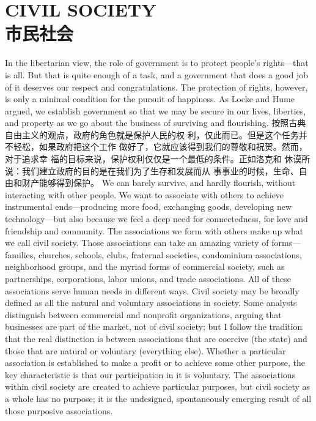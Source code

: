 \chapter{CIVIL SOCIETY\\市民社会}
\begin{paracol}{2}

In the libertarian view, the role of government is to protect people's rights---that is all. But that is quite
enough of a task, and a government that does a good job of it
deserves our respect and congratulations. The protection of
rights, however, is only a minimal condition for the pursuit of
happiness. As Locke and Hume argued, we establish government so that we may be secure in our lives, liberties, and property as we go about the business of surviving and flourishing.
\switchcolumn
按照古典自由主义的观点，政府的角色就是保护人民的权
利，仅此而已。但是这个任务并不轻松，如果政府把这个工作
做好了，它就应该得到我们的尊敬和祝贺。然而，对于追求幸
福的目标来说，保护权利仅仅是一个最低的条件。正如洛克和
休谟所说：我们建立政府的目的是在我们为了生存和发展而从
事事业的时候，生命、自由和财产能够得到保护。
\switchcolumn*
We can barely survive, and hardly flourish, without interacting with other people. We want to associate with others to
achieve instrumental ends---producing more food, exchanging
goods, developing new technology---but also because we feel a
deep need for connectedness, for love and friendship and community. The associations we form with others make up what we
call civil society. Those associations can take an amazing variety
of forms---families, churches, schools, clubs, fraternal societies,
condominium associations, neighborhood groups, and the myriad forms of commercial society, such as partnerships, corporations, labor unions, and trade associations. All of these
associations serve human needs in different ways. Civil society
may be broadly defined as all the natural and voluntary associations in society. Some analysts distinguish between commercial
and nonprofit organizations, arguing that businesses are part of
the market, not of civil society; but I follow the tradition that the real distinction is between associations that are coercive (the
state) and those that are natural or voluntary (everything else).
Whether a particular association is established to make a profit
or to achieve some other purpose, the key characteristic is that
our participation in it is voluntary. The associations within civil
society are created to achieve particular purposes, but civil society as a whole has no purpose; it is the undesigned, spontaneously emerging result of all those purposive associations.

\end{paracol}
